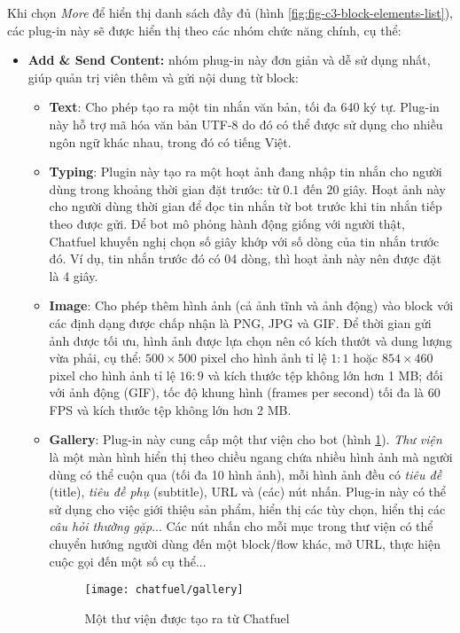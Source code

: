 Khi chọn \textit{More} để hiển thị danh sách đầy đủ (hình \ref{fig:fig-c3-block-elements-list}), các plug-in này sẽ được hiển thị theo các nhóm chức năng chính, cụ thể:
\begin{itemize}
	\item \textbf{Add \& Send Content:} nhóm phug-in này đơn giản và dễ sử dụng nhất, giúp quản trị viên thêm và gửi nội dung từ block: \begin{itemize}
		\item \textbf{Text}: Cho phép tạo ra một tin nhắn văn bản, tối đa 640 ký tự. Plug-in này hỗ trợ mã hóa văn bản UTF-8 do đó có thể được sử dụng cho nhiều ngôn ngữ khác nhau, trong đó có tiếng Việt.
		\item \textbf{Typing}: Plugin này tạo ra một hoạt ảnh đang nhập tin nhắn cho người dùng trong khoảng thời gian đặt trước: từ $0.1$ đến $20$ giây. Hoạt ảnh này cho người dùng thời gian để đọc tin nhắn từ bot trước khi tin nhắn tiếp theo được gửi. Để bot mô phỏng hành động giống với người thật, Chatfuel khuyến nghị chọn số giây khớp với số dòng của tin nhắn trước đó. Ví dụ, tin nhắn trước đó có 04 dòng, thì hoạt ảnh này nên được đặt là 4 giây.
		\item \textbf{Image}: Cho phép thêm hình ảnh (cả ảnh tĩnh và ảnh động) vào block với các định dạng được chấp nhận là PNG, JPG và GIF. Để thời gian gửi ảnh được tối ưu, hình ảnh được lựa chọn nên có kích thướt và dung lượng vừa phải, cụ thể: $500\times 500$ pixel cho hình ảnh tỉ lệ $1:1$ hoặc $854\times 460$ pixel cho hình ảnh tỉ lệ $16:9$ và kích thước tệp không lớn hơn 1 MB; đối với ảnh động (GIF), tốc độ khung hình (frames per second) tối đa là 60 FPS và kích thước tệp không lớn hơn 2 MB.
		\item \textbf{Gallery}: Plug-in này cung cấp một thư viện cho bot (hình \ref{fig:fig-s3-8-chatfuel-gallery}). \textit{Thư viện} là một màn hình hiển thị theo chiều ngang chứa nhiều hình ảnh mà người dùng có thể cuộn qua (tối đa 10 hình ảnh), mỗi hình ảnh đều có \textit{tiêu đề} (title), \textit{tiêu đề phụ} (subtitle), URL và (các) nút nhấn. Plug-in này có thể sử dụng cho việc giới thiệu sản phẩm, hiển thị các tùy chọn, hiển thị các \textit{câu hỏi thường gặp}... Các nút nhấn cho mỗi mục trong thư viện có thể chuyển hướng người dùng đến một block/flow khác, mở URL, thực hiện cuộc gọi đến một số cụ thể...\par
		\begin{figure}[htb!]\centering
			\texttt{[image: chatfuel/gallery]}
			\caption{Một thư viện được tạo ra từ Chatfuel}
			\label{fig:fig-s3-8-chatfuel-gallery}

\end{figure}
\end{itemize}
\end{itemize}
